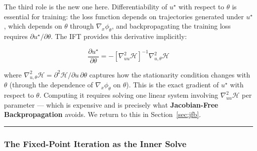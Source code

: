 \documentclass{article}
\begin{document}
\begin{mathrequirementsbox}
The third role is the new one here. Differentiability of $u^\star$ with respect
to $\theta$ is essential for training: the loss function depends on trajectories
generated under $u^\star$, which depends on $\theta$ through
$\nabla_x\phi_\theta$, and backpropagating the training loss requires
$\partial u^\star / \partial \theta$. The IFT provides this derivative
implicitly:

\begin{equation}
    \frac{\partial u^\star}{\partial \theta}
    = -\left[\nabla^2_{uu}\mathcal{H}\right]^{-1}
    \nabla_{u,\theta}^2 \mathcal{H}
    \label{eq:IFT_derivative}
\end{equation}

where $\nabla^2_{u,\theta}\mathcal{H} = \partial^2 \mathcal{H} /
\partial u\, \partial\theta$ captures how the stationarity condition changes
with $\theta$ (through the dependence of $\nabla_x\phi_\theta$ on $\theta$).
This is the exact gradient of $u^\star$ with respect to $\theta$. Computing it
requires solving one linear system involving $\nabla^2_{uu}\mathcal{H}$ per
parameter --- which is expensive and is precisely what
\textbf{Jacobian-Free Backpropagation} avoids. We return to this in Section~\ref{sec:jfb}.
\end{mathrequirementsbox}

\medskip\hrule\medskip

\subsubsection{The Fixed-Point Iteration as the Inner Solve}
\end{document}
